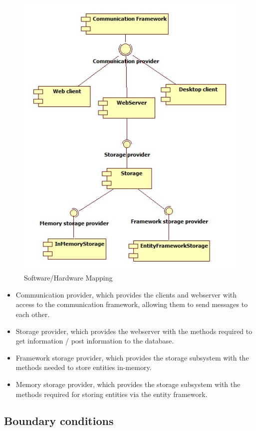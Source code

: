 \begin{figure}[H]
\includegraphics[scale=0.8]{img/SDD/SubsystemServices.jpg}
\caption{Software/Hardware Mapping}
\label{fig:Subsystem Services}
\end{figure}


\begin{itemize}
	\item Communication provider, which provides the clients and webserver with access to the communication framework, allowing them to send messages to each other.
	\item Storage provider, which provides the webserver with the methods required to get information / post information to the database.
	\item Framework storage provider, which provides the storage subsystem with the methods needed to store entities in-memory.
	\item Memory storage provider, which provides the storage subsystem with the methods required for storing entities via the entity framework.
\end{itemize}

\subsection{Boundary conditions}

